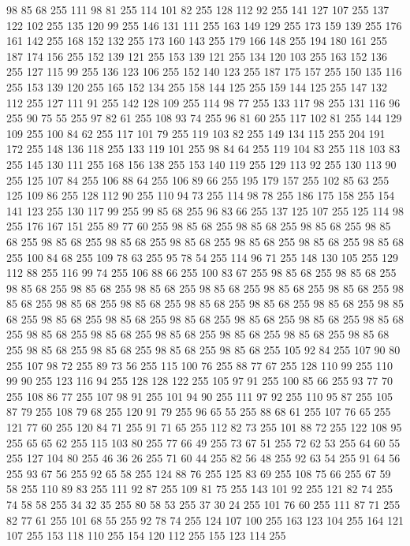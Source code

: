 98 85 68 255 111 98 81 255 114 101 82 255 128 112 92 255 141 127 107 255 137 122 102 255 135 120 99 255 146 131 111 255 163 149 129 255 173 159 139 255 176 161 142 255 168 152 132 255 173 160 143 255 179 166 148 255 194 180 161 255 187 174 156 255 152 139 121 255 153 139 121 255 134 120 103 255 163 152 136 255 127 115 99 255 136 123 106 255 152 140 123 255 187 175 157 255 150 135 116 255 153 139 120 255 165 152 134 255 158 144 125 255 159 144 125 255 147 132 112 255 127 111 91 255 142 128 109 255 114 98 77 255 133 117 98 255 131 116 96 255 90 75 55 255 97 82 61 255 108 93 74 255 96 81 60 255 117 102 81 255 144 129 109 255 100 84 62 255 117 101 79 255 119 103 82 255 149 134 115 255 204 191 172 255 148 136 118 255 133 119 101 255 98 84 64 255 119 104 83 255 118 103 83 255 145 130 111 255 168 156 138 255 153 140 119 255 129 113 92 255 130 113 90 255 125 107 84 255 106 88 64 255 106 89 66 255 195 179 157 255 102 85 63 255 125 109 86 255 128 112 90 255 110 94 73 255
114 98 78 255 186 175 158 255 154 141 123 255 130 117 99 255 99 85 68 255 96 83 66 255 137 125 107 255 125 114 98 255 176 167 151 255 89 77 60 255 98 85 68 255 98 85 68 255 98 85 68 255 98 85 68 255 98 85 68 255 98 85 68 255 98 85 68 255 98 85 68 255 98 85 68 255 98 85 68 255 100 84 68 255 109 78 63 255 95 78 54 255 114 96 71 255 148 130 105 255 129 112 88 255 116 99 74 255 106 88 66 255 100 83 67 255 98 85 68 255 98 85 68 255 98 85 68 255 98 85 68 255 98 85 68 255 98 85 68 255 98 85 68 255 98 85 68 255 98 85 68 255 98 85 68 255 98 85 68 255 98 85 68 255 98 85 68 255 98 85 68 255 98 85 68 255 98 85 68 255 98 85 68 255 98 85 68 255 98 85 68 255 98 85 68 255 98 85 68 255 98 85 68 255 98 85 68 255 98 85 68 255 98 85 68 255 98 85 68 255 98 85 68 255 98 85 68 255 98 85 68 255 98 85 68 255 98 85 68 255 105 92 84 255 107 90 80 255 107 98 72 255 89 73 56 255
115 100 76 255 88 77 67 255 128 110 99 255 110 99 90 255 123 116 94 255 128 128 122 255 105 97 91 255 100 85 66 255 93 77 70 255 108 86 77 255 107 98 91 255 101 94 90 255 111 97 92 255 110 95 87 255 105 87 79 255 108 79 68 255 120 91 79 255 96 65 55 255 88 68 61 255 107 76 65 255 121 77 60 255 120 84 71 255 91 71 65 255 112 82 73 255 101 88 72 255 122 108 95 255 65 65 62 255 115 103 80 255 77 66 49 255 73 67 51 255 72 62 53 255 64 60 55 255 127 104 80 255 46 36 26 255 71 60 44 255 82 56 48 255 92 63 54 255 91 64 56 255 93 67 56 255 92 65 58 255 124 88 76 255 125 83 69 255 108 75 66 255 67 59 58 255 110 89 83 255 111 92 87 255 109 81 75 255 143 101 92 255 121 82 74 255 74 58 58 255 34 32 35 255 80 58 53 255 37 30 24 255 101 76 60 255 111 87 71 255 82 77 61 255 101 68 55 255 92 78 74 255 124 107 100 255 163 123 104 255 164 121 107 255 153 118 110 255 154 120 112 255 155 123 114 255
